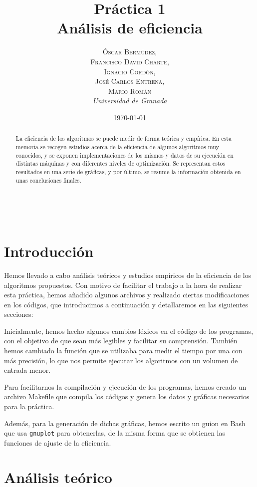 \documentclass[a4paper, 11pt]{article} %
\title{\textbf{Práctica 1}\\ %
Análisis de eficiencia} %
\author{\textsc{Óscar Bermúdez,\\Francisco David Charte,\\Ignacio Cordón,\\José Carlos Entrena,\\Mario Román} %
\\{\textit{Universidad de Granada}}} %
\date{\today} %
\makeatletter
\renewcommand{\maketitle}{ %
\begin{flushright} %
{\LARGE\@title} %

\vspace{50pt} %

{\large\@author} %
\\\@date %

\vspace{40pt} %
\end{flushright}
}
\makeatother
\begin{document}
\maketitle %

\renewcommand{\abstractname}{Resumen} %
\begin{abstract}
La eficiencia de los algoritmos se puede medir de forma teórica 
y empírica. En esta memoria se recogen estudios acerca de la 
eficiencia de algunos algoritmos muy conocidos, y se exponen 
implementaciones de los mismos y datos de su ejecución en 
distintas máquinas y con diferentes niveles de optimización.
Se representan estos resultados en una serie de gráficas, y por 
último, se resume la información obtenida en unas conclusiones 
finales.
\end{abstract}
{\parskip=2pt
\tableofcontents
}
\pagebreak

\section {Introducción}
Hemos llevado a cabo análisis teóricos y estudios empíricos de la eficiencia de los algoritmos propuestos. Con motivo de facilitar el trabajo a la hora de realizar esta práctica,
hemos añadido algunos archivos y realizado ciertas modificaciones en los códigos, que
introducimos a continuación y detallaremos en las siguientes secciones: 

Inicialmente, hemos hecho algunos cambios léxicos en el código de los programas, con el
objetivo de que sean más legibles y facilitar su comprensión. También hemos
cambiado la función que se utilizaba para medir el tiempo por una con más precisión, lo 
que nos permite ejecutar los algoritmos con un volumen de entrada menor. 

Para facilitarnos la compilación y ejecución de los programas, hemos creado un archivo 
Makefile que compila los códigos y genera los datos y gráficas necesarios para la práctica.

Además, para la generación de dichas gráficas, hemos escrito un guion en Bash que usa 
\texttt{gnuplot} para obtenerlas, de la misma forma que se obtienen las funciones de ajuste 
de la eficiencia. 

\section {Análisis teórico}
\end{document}
